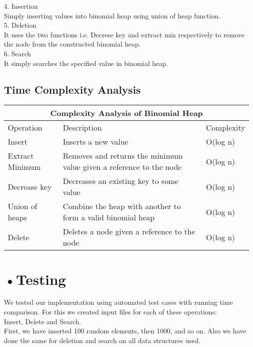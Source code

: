 \documentclass[10pt,a4paper]{article}
\begin{document}
	
4. Insertion
	\\Simply inserting values into binomial heap using union of heap function.\\
	
5. Deletion
	\\It uses the two functions i.e. Decrese key and extract min respectively to remove the node from the constructed binomial heap.\\
	
6. Search
	\\It simply searches the specified value in binomial heap.\\

\subsection*{Time Complexity Analysis}

\begin{tabular}{ |p{3cm}||p{6cm}||p{3cm}|  }
 \hline
 \multicolumn{3}{|c|}{Complexity Analysis of Binomial Heap} \\
 \hline
  Operation& Description & Complexity\\
 \hline
Insert & Inserts a new value  & O(log n)\\
Extract Minimum& Removes and returns the minimum value given a reference to the node & O(log n)   \\
Decrease key& Decreases an existing key to some value  &O(log n)\\
Union of heaps & Combine the heap with another to form a valid binomial heap  &O(log n)\\
Delete & Deletes a node given a reference to the node & O(log n)\\
 \hline
\end{tabular}


	\section*{•Testing} 
	
	We tested our implementation using automated test cases with running time comparison.
	For this we created input files for each of these operations:\\
	Insert, Delete and Search. \\ 

First, we have inserted 100 random elements, then 1000, and so on. 
Also we have done the same for deletion and search on all data structures used.\\
\end{document}
